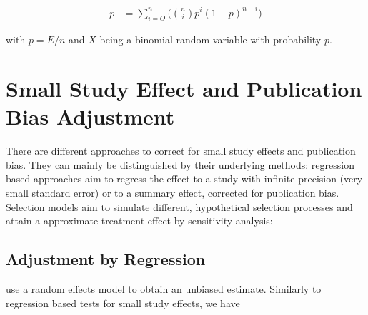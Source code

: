 \documentclass[11pt,a4paper,twoside]{book}\usepackage[]{graphicx}\usepackage[]{color}
\begin{document}
\begin{align}
p &= \sum_{i = O}^n\Big({n \choose i} p^i (1-p)^{n - i}\Big)
\end{align}

with $p = E/n$ and $X$ being a binomial random variable with probability $p$. 











\section{Small Study Effect and Publication Bias Adjustment}
There are different approaches to correct for small study effects and publication bias. They can mainly be distinguished by their underlying methods: regression based approaches aim to regress the effect to a study with infinite precision (\ie very small standard error) or to a summary effect, corrected for publication bias. Selection models aim to simulate different, hypothetical selection processes and attain a approximate treatment effect by sensitivity analysis:

\subsection{Adjustment by Regression} \label{sec:regression.adjustment}
\citet{limitmeta} use a random effects model %
to obtain an unbiased estimate. Similarly to 
regression based tests for small study effects, we have
\end{document}
